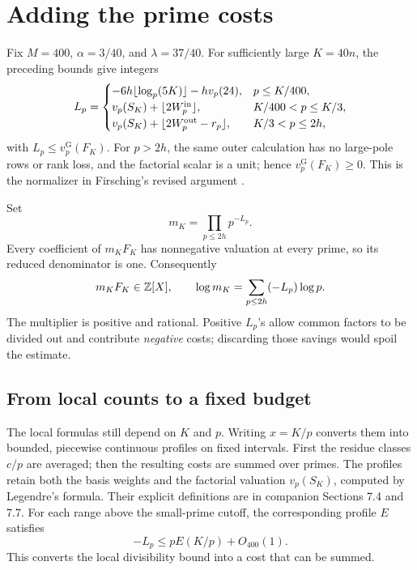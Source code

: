 \section{Adding the prime costs}\label{growth:section}

Fix \(M=400\), \(\alpha=3/40\), and \(\lambda=37/40\).
For sufficiently large \(K=40n\), the preceding bounds give integers
\begin{equation}\label{growth:Lp}
 L_p=
 \begin{cases}
 -6h\lfloor\log_p(5K)\rfloor-hv_p(24),&p\le K/400,\\
 v_p(S_K)+\lfloor2W_p^{\rm in}\rfloor,&K/400<p\le K/3,\\
 v_p(S_K)+\lfloor2W_p^{\rm out}-r_p\rfloor,&K/3<p\le2h,
 \end{cases}
\end{equation}
with \(L_p\le v_p^{\mathrm G}(F_K)\).
For \(p>2h\), the same outer calculation has no large-pole rows or
rank loss, and the factorial scalar is a unit; hence
\(v_p^{\mathrm G}(F_K)\ge0\).
This is the normalizer in Firsching's revised argument
\cite[\texttt{Norm.lean}]{firsching}.

Set
\begin{equation}\label{growth:normalizer}
 m_K=\prod_{p\le2h}p^{-L_p}.
\end{equation}
Every coefficient of \(m_KF_K\) has nonnegative valuation at every
prime, so its reduced denominator is one. Consequently
\begin{equation}\label{growth:integrality}
 m_KF_K\in\mathbb Z[X],\qquad
 \log m_K=\sum_{p\le2h}(-L_p)\log p.
\end{equation}
The multiplier is positive and rational. Positive \(L_p\)'s allow
common factors to be divided out and contribute \emph{negative} costs;
discarding those savings would spoil the estimate.

\subsection{From local counts to a fixed budget}

The local formulas still depend on \(K\) and \(p\).
Writing \(x=K/p\) converts them into bounded, piecewise continuous
profiles on fixed intervals. First the residue classes \(c/p\)
are averaged; then the resulting costs are summed over primes.
The profiles retain both the basis weights and the factorial
valuation \(v_p(S_K)\), computed by Legendre's formula.
Their explicit definitions are in companion Sections 7.4 and 7.7.
For each range above the small-prime cutoff, the corresponding profile
\(E\) satisfies
\[
 -L_p\le pE(K/p)+O_{400}(1).
\]
This converts the local divisibility bound into a cost that can be summed.

